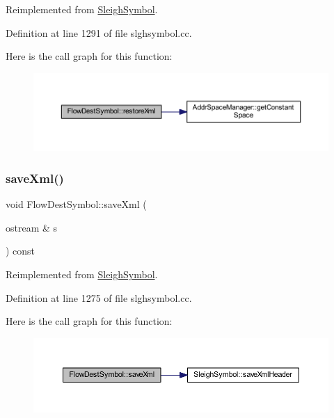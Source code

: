 Reimplemented from \mbox{\hyperlink{class_sleigh_symbol_accaec1696f99366fb0e089a7fceb56a3}{Sleigh\+Symbol}}.



Definition at line 1291 of file slghsymbol.\+cc.

Here is the call graph for this function\+:
\nopagebreak
\begin{figure}[H]
\begin{center}
\leavevmode
\includegraphics[width=350pt]{class_flow_dest_symbol_a1ba9aafc51b34b72972f50748de739cc_cgraph}
\end{center}
\end{figure}
\mbox{\label{class_flow_dest_symbol_a2323c675f5969475af4030a87ae45319}} 
\subsubsection{\texorpdfstring{saveXml()}{saveXml()}}
{\footnotesize\ttfamily void Flow\+Dest\+Symbol\+::save\+Xml (\begin{DoxyParamCaption}\item[{ostream \&}]{s }\end{DoxyParamCaption}) const\hspace{0.3cm}{\ttfamily [virtual]}}



Reimplemented from \mbox{\hyperlink{class_sleigh_symbol_a83c9a32d16419d2277c5b9d542e1cf13}{Sleigh\+Symbol}}.



Definition at line 1275 of file slghsymbol.\+cc.

Here is the call graph for this function\+:
\nopagebreak
\begin{figure}[H]
\begin{center}
\leavevmode
\includegraphics[width=350pt]{class_flow_dest_symbol_a2323c675f5969475af4030a87ae45319_cgraph}
\end{center}
\end{figure}
\mbox{\label{class_flow_dest_symbol_a5e0a88af96879af7f778fdbc0bfa0a27}} 
